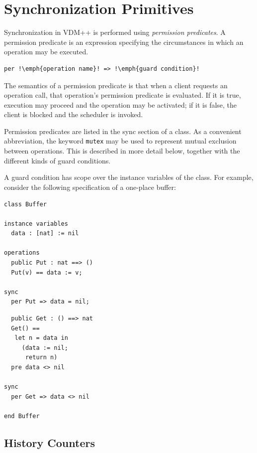 \documentclass{overturerepchap}
\begin{document}
\section{Synchronization Primitives}

Synchronization in VDM++ is performed using \emph{permission predicates}. A
permission predicate is an expression specifying the circumstances in
which an operation may be executed.

\begin{lstlisting}
per !\emph{operation name}! => !\emph{guard condition}!
\end{lstlisting}

The semantics of a permission predicate is that when a client requests
an operation call, that operation's permission predicate is
evaluated. If it is true, execution may proceed and the operation may
be activated; if it is false, the client is blocked and the scheduler
is invoked.

Permission predicates are listed in the sync section of a class. As a
convenient abbreviation, the keyword \texttt{mutex} may be used to represent
mutual exclusion between operations. This is described in more detail
below, together with the different kinds of guard conditions.

A guard condition has scope over the instance variables of the
class. For example, consider the following specification of a
one-place buffer:

\begin{multicols}{2}
\begin{lstlisting}
class Buffer

instance variables
  data : [nat] := nil

operations
  public Put : nat ==> ()
  Put(v) == data := v;

sync
  per Put => data = nil;
\end{lstlisting}
\begin{lstlisting}
  public Get : () ==> nat
  Get() ==
   let n = data in
     (data := nil;
      return n)
  pre data <> nil

sync
  per Get => data <> nil

end Buffer
\end{lstlisting}
\end{multicols}

\subsection{History Counters}
\end{document}
